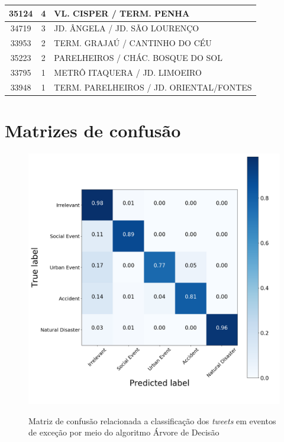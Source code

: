 \documentclass[
	12pt,				%
	oneside,			%
	a4paper,			%
	english,			%
	brazil				%
	]{abntex2ppgsi}
\begin{document}
{{\begin{apendicesenv}
\begin{longtable}{c|c|p{7cm}}
    35124 & 4     & VL. CISPER / TERM. PENHA \\
\hline

    34719 & 3     & JD. ÂNGELA / JD. SÃO LOURENÇO \\
\hline

    33953 & 2     & TERM. GRAJAÚ / CANTINHO DO CÉU \\
\hline

    35223 & 2     & PARELHEIROS / CHÁC. BOSQUE DO SOL \\
\hline

    33795 & 1     & METRÔ ITAQUERA / JD. LIMOEIRO \\
\hline

    33948 & 1     & TERM. PARELHEIROS / JD. ORIENTAL/FONTES \\
\hline


\end{longtable}

\normalsize

\chapter{Matrizes de confusão}
\label{apendiceE}

\begin{figure}[!htb]
	\centering
 	  \caption{Matriz de confusão relacionada a classificação dos \textit{tweets} em eventos de exceção por meio do algoritmo Árvore de Decisão}
		\includegraphics[width=1\linewidth]{images/confusion_matrix_dt.png}
	\label{fig:confusion_matrix_dt}
\end{figure}


\end{apendicesenv}}}
\end{document}
